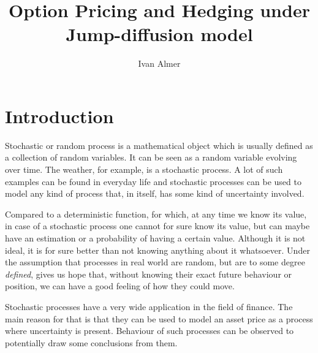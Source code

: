 \documentclass[times, utf8, diplomski]{fer}
\begin{document}
\renewcommand*\contentsname{Table of contents}
\newcommand\indeq{\mathrel{\overset{\makebox[0pt]{\mbox{\normalfont\tiny\sffamily ind.}}}{=}}}
\newtheorem{proposition}{Proposition}
\newtheorem{theorem}{Theorem}
\newtheorem{definition}{Definition}

\renewcommand{\labelitemi}{$\bullet$}


\title{Option Pricing and Hedging under Jump-diffusion model}

\author{Ivan Almer}

\maketitle


\zahvala{}

\tableofcontents

\chapter{Introduction}
Stochastic or random process is a mathematical object which is usually defined as a collection of random variables. It can be seen as a random variable evolving over time. The weather, for example, is a stochastic process. A lot of such examples can be found in everyday life and stochastic processes can be used to model any kind of process that, in itself, has some kind of uncertainty involved. 

Compared to a deterministic function, for which, at any time we know its value, in case of a stochastic process one cannot for sure know its value, but can maybe have an estimation or a probability of having a certain value. Although it is not ideal, it is for sure better than not knowing anything about it whatsoever. Under the assumption that processes in real world are random, but are to some degree \textit{defined}, gives us hope that, without knowing their exact future behaviour or position, we can have a good feeling of how they could move.

Stochastic processes have a very wide application in the field of finance. The main reason for that is that they can be used to model an asset price as a process where uncertainty is present. Behaviour of such processes can be observed to potentially draw some conclusions from them. 
\end{document}
